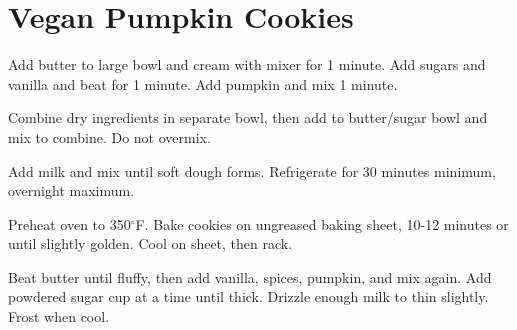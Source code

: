 \section{Vegan Pumpkin Cookies}
\begin{recipe}



	Add butter to large bowl and cream with mixer for 1 minute. Add sugars and vanilla and beat for 1 minute. Add pumpkin and mix 1 minute.

	Combine dry ingredients in separate bowl, then add to butter/sugar bowl and mix to combine. Do not overmix.

	Add milk and mix until soft dough forms. Refrigerate for 30 minutes minimum, overnight maximum.

	Preheat oven to 350$^{\circ}$F. Bake cookies on ungreased baking sheet, 10-12 minutes or until slightly golden. Cool on sheet, then rack.


	Beat butter until fluffy, then add vanilla, spices, pumpkin, and mix again. Add powdered sugar  cup at a time until thick. Drizzle enough milk to thin slightly. Frost when cool.


\end{recipe}
